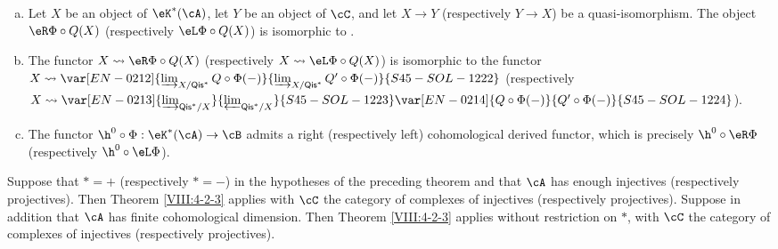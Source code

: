 \begin{theorem}
\begin{enumerate}[a)]
    The restriction of the functor
    $Q'\circ \Phi:\eK^\ast(\cA) \to \eD^{\ast'}(\cB)$ to $\cC$ vanishes on the
    objects of $\cN$ and therefore factors through $\cC/\cN$. This gives
    a functor $\Phi':\cC/\cN\to \eD^{\ast'}(\cB)$. But the natural
    functor $\cC/\cN\to \eD^\ast(\cA)$ is an equivalence of categories
    (Theorem \ref{VIII:2-4-2}). Composing with its quasi-inverse gives the
    functor $\eR\Phi$ (respectively $\eL \Phi$).
  \item Let $X$ be an object of $\eK^\ast(\cA)$, let $Y$ be an object of
    $\cC$, and let $X\to Y$ (respectively $Y\to X$) be a
    quasi-isomorphism. The object $\eR\Phi\circ Q(X)$ (respectively
    $\eL \Phi\circ Q(X)$) is isomorphic to .
  \item The functor $X\leadsto \eR\Phi\circ Q(X)$ (respectively
    $X\leadsto \eL \Phi\circ Q(X)$) is isomorphic to the functor
    $X\leadsto \var[EN-0212]{\varinjlim_{X/\mathsf{Qis}^\ast} Q\circ\Phi(-)}{\varinjlim_{X/\mathsf{Qis}^\ast} Q'\circ\Phi(-)}{S45-SOL-1222}$
    (respectively
    $X\leadsto \var[EN-0213]{\varinjlim_{\mathsf{Qis}^\ast/X}}{\varprojlim_{\mathsf{Qis}^\ast/X}}{S45-SOL-1223} \var[EN-0214]{Q\circ \Phi(-)}{Q'\circ \Phi(-)}{S45-SOL-1224}$).
  \item The functor $\h^0{}\circ \Phi:\eK^\ast(\cA)\to \cB$ admits a
    right (respectively left) cohomological derived functor, which is
    precisely $\h^0{}\circ\eR\Phi$ (respectively
    $\h^0{}\circ \eL\Phi$).
\end{enumerate}
\end{theorem}

\begin{corollary}\label{VIII:4-2-3-1} %
Suppose that $\ast=+$ (respectively $\ast=-$) in the hypotheses of the
preceding theorem and that $\cA$ has enough injectives (respectively
projectives). Then Theorem \ref{VIII:4-2-3} applies with $\cC$ the
category of complexes of injectives (respectively projectives). Suppose
in addition that $\cA$ has finite cohomological dimension. Then Theorem \ref{VIII:4-2-3} applies without restriction on $\ast$, with $\cC$ the category
of complexes of injectives (respectively projectives).
\end{corollary}

